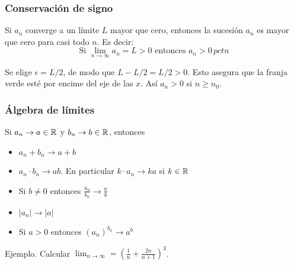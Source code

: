 \documentclass[../teoria.root.tex]{subfiles}
\begin{document}
\subsubsection{Conservación de signo}
Si \(a_n\) converge a un límite \(L\) mayor que cero, entonces la sucesión \(a_n\) es mayor que cero para casi todo \(n\).
Es decir:
\[\text{Si }\lim_{n\to\infty}a_n=L>0\text{ entonces }a_n>0\,pctn\]
\begin{center}
    \begin{scaletikzpicturetowidth}{.5\linewidth}
    \end{scaletikzpicturetowidth}
\end{center}
Se elige \(\epsilon=L/2\), de modo que \(L-L/2=L/2>0\).
Esto asegura que la franja verde esté por encime del eje de las \(x\).
Así \(a_n>0\) si \(n\geq n_0\).
\subsubsection{Álgebra de límites}
Si \(a_n\rightarrow a\in\mathbb{R}\) y \(b_n\rightarrow b\in\mathbb{R}\), entonces
\begin{itemize}
    \item \(a_n+b_n\rightarrow a+b\)
    \item \(a_n\cdot b_n\rightarrow ab\).
          En particular \(k\cdot a_n\rightarrow ka\) si \(k\in\mathbb{R}\)
    \item Si \(b\neq0\) entonces \(\frac{a_n}{b_n}\rightarrow\frac{a}{b}\)
    \item \(|a_n|\rightarrow|a|\)
    \item Si \(a>0\) entonces \((a_n)^{b_n}\rightarrow a^b\)
\end{itemize}
Ejemplo.
Calcular \(\lim_{n\to\infty}=\left(\frac{1}{n}+\frac{2n}{n+1}\right)^3\).
\end{document}
